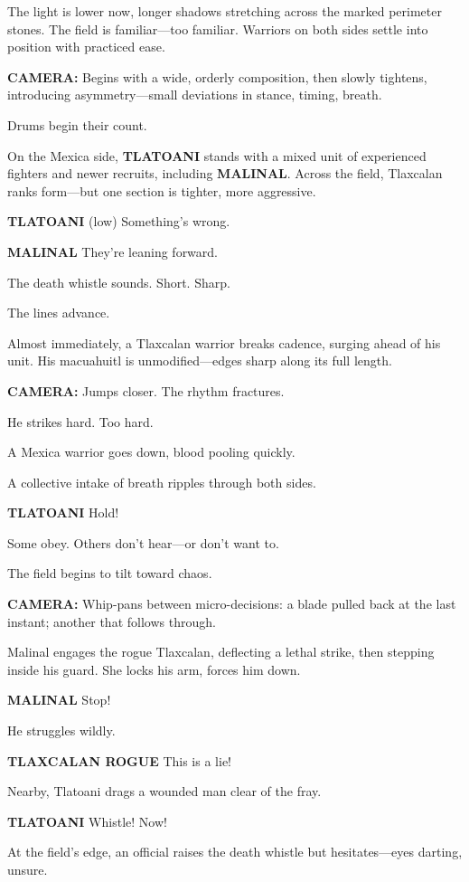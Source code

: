 \documentclass[12pt]{article}
\begin{document}
The light is lower now, longer shadows stretching across the marked perimeter stones. The field is familiar—too familiar. Warriors on both sides settle into position with practiced ease.

\textbf{CAMERA:} Begins with a wide, orderly composition, then slowly tightens, introducing asymmetry—small deviations in stance, timing, breath.

Drums begin their count.

On the Mexica side, \textbf{TLATOANI} stands with a mixed unit of experienced fighters and newer recruits, including \textbf{MALINAL}. Across the field, Tlaxcalan ranks form—but one section is tighter, more aggressive.

\textbf{TLATOANI}  
(low)  
Something’s wrong.

\textbf{MALINAL}  
They’re leaning forward.

The death whistle sounds. Short. Sharp.

The lines advance.

Almost immediately, a Tlaxcalan warrior breaks cadence, surging ahead of his unit. His macuahuitl is unmodified—edges sharp along its full length.

\textbf{CAMERA:} Jumps closer. The rhythm fractures.

He strikes hard. Too hard.

A Mexica warrior goes down, blood pooling quickly.

A collective intake of breath ripples through both sides.

\textbf{TLATOANI}  
Hold!

Some obey. Others don’t hear—or don’t want to.

The field begins to tilt toward chaos.

\textbf{CAMERA:} Whip-pans between micro-decisions: a blade pulled back at the last instant; another that follows through.

Malinal engages the rogue Tlaxcalan, deflecting a lethal strike, then stepping inside his guard. She locks his arm, forces him down.

\textbf{MALINAL}  
Stop!

He struggles wildly.

\textbf{TLAXCALAN ROGUE}  
This is a lie!

Nearby, Tlatoani drags a wounded man clear of the fray.

\textbf{TLATOANI}  
Whistle! Now!

At the field’s edge, an official raises the death whistle but hesitates—eyes darting, unsure.
\end{document}
